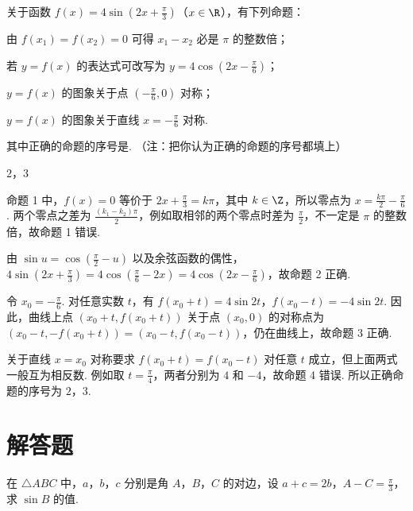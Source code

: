 \documentclass[UTF8,a4paper,oneside,11pt]{ctexbook}
\begin{document}
\begin{problem}
关于函数 \(f(x)=4\sin \left(2x+\frac{\pi}{3}\right)\)（\(x\in\R\)），有下列命题：
\begin{circlelist}
\item 由 \(f(x_{1})=f(x_{2})=0\) 可得 \(x_{1}-x_{2}\) 必是 \(\pi\) 的整数倍；
\item 若 \(y=f(x)\) 的表达式可改写为 \(y=4\cos \left(2x-\frac{\pi}{6}\right)\)；
\item \(y=f(x)\) 的图象关于点 \(\left(-\frac{\pi}{6}, 0\right)\) 对称；
\item \(y=f(x)\) 的图象关于直线 \(x=-\frac{\pi}{6}\) 对称.
\end{circlelist}
其中正确的命题的序号是\fillinblank{}. （注：把你认为正确的命题的序号都填上）
\end{problem}

\begin{answer}
\(2\)，\(3\)
\end{answer}

\begin{solution}
命题 1 中，\(f(x)=0\) 等价于 \(2x+\frac{\pi}{3}=k\pi\)，其中 \(k\in\Z\)，所以零点为 \(x=\frac{k\pi}{2}-\frac{\pi}{6}\). 两个零点之差为 \(\frac{(k_{1}-k_{2})\pi}{2}\)，例如取相邻的两个零点时差为 \(\frac{\pi}{2}\)，不一定是 \(\pi\) 的整数倍，故命题 1 错误.

由 \(\sin u=\cos\left(\frac{\pi}{2}-u\right)\) 以及余弦函数的偶性，
\(4\sin\left(2x+\frac{\pi}{3}\right)=4\cos\left(\frac{\pi}{6}-2x\right)=4\cos\left(2x-\frac{\pi}{6}\right)\)，故命题 2 正确.

令 \(x_{0}=-\frac{\pi}{6}\). 对任意实数 \(t\)，有 \(f(x_{0}+t)=4\sin 2t\)，\(f(x_{0}-t)=-4\sin 2t\). 因此，曲线上点 \(\left(x_{0}+t,f(x_{0}+t)\right)\) 关于点 \(\left(x_{0},0\right)\) 的对称点为 \(\left(x_{0}-t,-f(x_{0}+t)\right)=\left(x_{0}-t,f(x_{0}-t)\right)\)，仍在曲线上，故命题 3 正确.

关于直线 \(x=x_{0}\) 对称要求 \(f(x_{0}+t)=f(x_{0}-t)\) 对任意 \(t\) 成立，但上面两式一般互为相反数. 例如取 \(t=\frac{\pi}{4}\)，两者分别为 \(4\) 和 \(-4\)，故命题 4 错误. 所以正确命题的序号为 \(2\)，\(3\).
\end{solution}

\section{解答题}

\begin{problem}
在 \(\triangle ABC\) 中，\(a\)，\(b\)，\(c\) 分别是角 \(A\)，\(B\)，\(C\) 的对边，设 \(a + c = 2b\)，\(A - C = \frac{\pi}{3}\)，求 \(\sin B\) 的值.
\end{problem}
\end{document}
